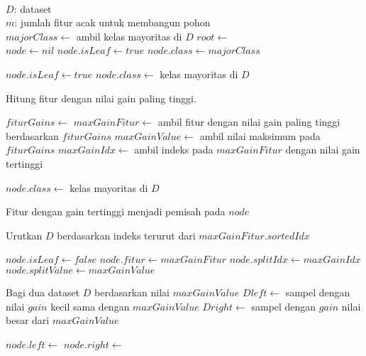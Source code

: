 \begin{center}
	\label{alg:cart}
	\begin{algorithmic}[1]

\Require \\
$D$: dataset \\
$m$: jumlah fitur acak untuk membangun pohon \\

	\State $ majorClass \gets $ ambil kelas mayoritas di $ D $
	\State $ root \gets $ 
	\State {}
\EndFunction
\\
	\State $ node \gets nil $
		\State $ node.isLeaf \gets true $
		\State $ node.class \gets majorClass $
		\State {}
	\EndIf

		\State $ node.isLeaf \gets true $
		\State $ node.class \gets $ kelas mayoritas di $ D $
		\State {}
	\EndIf

	\Comment Hitung fitur dengan nilai gain paling tinggi.

	\State $ fiturGains \gets $ 
	\State $ maxGainFitur \gets $ ambil fitur dengan nilai gain paling tinggi
	berdasarkan $fiturGains$
	\State $ maxGainValue \gets $ ambil nilai maksimum pada $fiturGains$
	\State $ maxGainIdx \gets $ ambil indeks pada $maxGainFitur$ dengan
	nilai gain tertinggi

		\State $ node.class \gets $ kelas mayoritas di $ D $
		\State {}
	\EndIf

	\Comment Fitur dengan gain tertinggi menjadi pemisah pada $node$

	\State Urutkan $ D $ berdasarkan indeks terurut dari $maxGainFitur.sortedIdx$

	\State $ node.isLeaf \gets false $
	\State $ node.fitur \gets maxGainFitur $
	\State $ node.splitIdx \gets maxGainIdx $
	\State $ node.splitValue \gets maxGainValue $

	\Comment Bagi dua dataset $D$ berdasarkan nilai $maxGainValue$
	\State $ Dleft \gets $ sampel dengan nilai $gain$ kecil sama dengan
	$maxGainValue$
	\State $ Dright \gets $ sampel dengan $gain$ nilai besar dari
	$maxGainValue$

	\State $ node.left \gets $ 
	\State $ node.right \gets $ 


\end{algorithmic}
\end{center}

